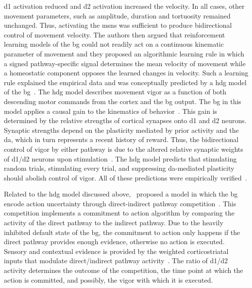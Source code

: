 \gls{d1} activation reduced and \gls{d2} activation increased the velocity.
In all cases, other movement parameters, such as amplitude, duration and tortuosity remained unchanged.
Thus, activating the \glspl{msn} was sufficient to produce bidirectional control of movement velocity.
The authors then argued that reinforcement learning models of the \gls{bg} could not readily act on a continuous kinematic parameter of movement and they proposed an algorithmic learning rule in which a signed pathway-specific signal determines the mean velocity of movement while a homeostatic component opposes the learned changes in velocity.
Such a learning rule explained the empirical data and was conceptually predicted by a \gls{hdg} model of the \gls{bg}~\cite{Yttri2016Nature, Yttri2018MovDisorder}.
The \gls{hdg} model describes movement vigor as a function of both descending motor commands from the cortex and the \gls{bg} output.
The \gls{bg} in this model applies a causal gain to the kinematics of behavior~\cite{Yttri2018MovDisorder}.
This gain is determined by the relative strengths of cortical synapses onto \gls{d1} and \gls{d2} neurons.
Synaptic strengths depend on the plasticity mediated by prior activity and the \gls{da}, which in turn represents a recent history of reward.
Thus, the bidirectional control of vigor by either pathway is due to the altered relative synaptic weights of \gls{d1}/\gls{d2} neurons upon stimulation~\cite{Yttri2016Nature}.
The \Gls{hdg} model predicts that stimulating random trials, stimulating every trial, and suppressing \gls{da}-mediated plasticity should abolish control of vigor.
All of these predictions were empirically verified~\cite{Yttri2016Nature}.
\par
Related to the \gls{hdg} model discussed above,~\citeauthor{Dunovan2016FrontNeurosci} proposed a model in which the \gls{bg} encode action uncertainty through direct-indirect pathway competition~\cite{Dunovan2016FrontNeurosci}.
This competition implements a commitment to action algorithm by comparing the activity of the direct pathway to the indirect pathway.
Due to the heavily inhibited default state of the \gls{bg}, the commitment to action only happens if the direct pathway provides enough evidence, otherwise no action is executed.
Sensory and contextual evidence is provided by the weighted corticostriatal inputs that modulate direct/indirect pathway activity~\cite{Dunovan2016FrontNeurosci}.
The ratio of \gls{d1}/\gls{d2} activity determines the outcome of the competition, the time point at which the action is committed, and possibly, the vigor with which it is executed.